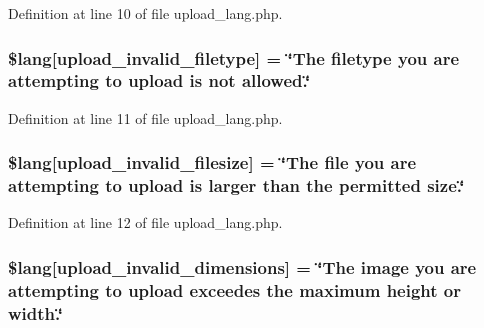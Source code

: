 Definition at line 10 of file upload\+\_\+lang.\+php.

\subsubsection[{\texorpdfstring{\$lang}{$lang}}]{\setlength{\rightskip}{0pt plus 5cm}\$lang\mbox{[}\textquotesingle{}upload\+\_\+invalid\+\_\+filetype\textquotesingle{}\mbox{]} = \char`\"{}The filetype you are attempting to upload is not allowed.\char`\"{}}\hypertarget{system_2language_2english_2upload__lang_8php_ac8631aa85ed80396bd78e91a76d5fd38}{}\label{system_2language_2english_2upload__lang_8php_ac8631aa85ed80396bd78e91a76d5fd38}


Definition at line 11 of file upload\+\_\+lang.\+php.

\subsubsection[{\texorpdfstring{\$lang}{$lang}}]{\setlength{\rightskip}{0pt plus 5cm}\$lang\mbox{[}\textquotesingle{}upload\+\_\+invalid\+\_\+filesize\textquotesingle{}\mbox{]} = \char`\"{}The file you are attempting to upload is larger than the permitted size.\char`\"{}}\hypertarget{system_2language_2english_2upload__lang_8php_a832b3ec1d84b1d48a488cf525954d8f2}{}\label{system_2language_2english_2upload__lang_8php_a832b3ec1d84b1d48a488cf525954d8f2}


Definition at line 12 of file upload\+\_\+lang.\+php.

\subsubsection[{\texorpdfstring{\$lang}{$lang}}]{\setlength{\rightskip}{0pt plus 5cm}\$lang\mbox{[}\textquotesingle{}upload\+\_\+invalid\+\_\+dimensions\textquotesingle{}\mbox{]} = \char`\"{}The image you are attempting to upload exceedes the maximum {\bf height} or width.\char`\"{}}\hypertarget{system_2language_2english_2upload__lang_8php_a4e796eeccf7df90acffea7884a5bd558}{}\label{system_2language_2english_2upload__lang_8php_a4e796eeccf7df90acffea7884a5bd558}


